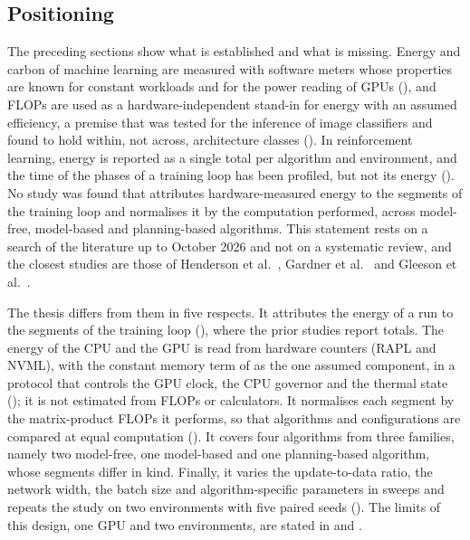\subsection{Positioning}\label{sec:related-positioning}

The preceding sections show what is established and what is missing.
Energy and carbon of machine learning are measured with software meters whose properties are known for constant workloads and for the power reading of GPUs (), and FLOPs are used as a hardware-independent stand-in for energy with an assumed efficiency, a premise that was tested for the inference of image classifiers and found to hold within, not across, architecture classes ().
In reinforcement learning, energy is reported as a single total per algorithm and environment, and the time of the phases of a training loop has been profiled, but not its energy ().
No study was found that attributes hardware-measured energy to the segments of the training loop and normalises it by the computation performed, across model-free, model-based and planning-based algorithms.
This statement rests on a search of the literature up to October 2026 and not on a systematic review, and the closest studies are those of Henderson et al.~\cite{henderson2020systematic}, Gardner et al.~\cite{gardner2025greener} and Gleeson et al.~\cite{gleeson2021rlscope}.

The thesis differs from them in five respects.
It attributes the energy of a run to the segments of the training loop (), where the prior studies report totals.
The energy of the CPU and the GPU is read from hardware counters (RAPL and NVML), with the constant memory term of  as the one assumed component, in a protocol that controls the GPU clock, the CPU governor and the thermal state (); it is not estimated from FLOPs or calculators.
It normalises each segment by the matrix-product FLOPs it performs, so that algorithms and configurations are compared at equal computation ().
It covers four algorithms from three families, namely two model-free, one model-based and one planning-based algorithm, whose segments differ in kind.
Finally, it varies the update-to-data ratio, the network width, the batch size and algorithm-specific parameters in sweeps and repeats the study on two environments with five paired seeds ().
The limits of this design, one GPU and two environments, are stated in  and .
